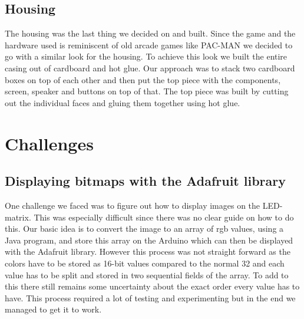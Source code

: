 \documentclass[10pt, a4paper]{article}
\begin{document}
\subsection*{Housing}

The housing was the last thing we decided on and built. Since the game and the hardware used is reminiscent of old arcade games like PAC-MAN we decided to go with a similar look for the housing. To achieve this look we built the entire casing out of cardboard and hot glue. Our approach was to stack two cardboard boxes on top of each other and then put the top piece with the components, screen, speaker and buttons on top of that. The top piece was built by cutting out the individual faces and gluing them together using hot glue.


\section*{Challenges}
\label{sec:challenges}

\subsection*{Displaying bitmaps with the Adafruit library}
One challenge we faced was to figure out how to display images on the LED-matrix. This was especially difficult since there was no clear guide on how to do this. Our basic idea is to convert the image to an array of rgb values, using a Java program, and store this array on the Arduino which can then be displayed with the Adafruit library. However this process was not straight forward as the colors have to be stored as 16-bit values compared to the normal 32 and each value has to be split and stored in two sequential fields of the array. To add to this there still remains some uncertainty about the exact order every value has to have. This process required a lot of testing and experimenting but in the end we managed to get it to work. 
\end{document}
